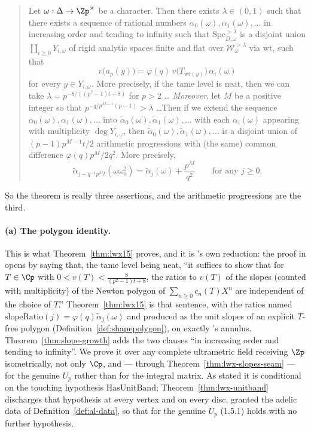 \begin{quote}
  Let $\omega : \Delta \to \Zp^{\times}$ be a character.  Then there exists
  $\lambda \in (0,1)$ such that there exists a sequence of rational numbers
  $\alpha_0(\omega), \alpha_1(\omega), \dots$ in increasing order and tending to infinity such
  that $\mathrm{Spc}^{>\lambda}_{D,\omega}$ is a disjoint union
  $\coprod_{i\geq 0} Y_{i,\omega}$ of rigid analytic spaces finite and flat over
  $\mathcal{W}^{>\lambda}_\omega$ via $\mathrm{wt}$, such that
  \[
    v\bigl(a_p(y)\bigr) = \varphi(q)\,v\bigl(T_{\mathrm{wt}(y)}\bigr)\,\alpha_i(\omega)
    \tag{1.5.1}
  \]
  for every $y \in Y_{i,\omega}$.  More precisely, if the tame level is neat, then we can take
  $\lambda = p^{-8/((p^{2}-1)t+8)}$ for $p > 2$ \dots
  \emph{Moreover}, let $M$ be a positive integer so that $p^{-q/p^{M-1}(p-1)} > \lambda$
  \dots  Then if we extend the sequence $\alpha_0(\omega), \alpha_1(\omega),\dots$ into
  $\tilde\alpha_0(\omega), \tilde\alpha_1(\omega), \dots$ with each $\alpha_i(\omega)$ appearing
  with multiplicity $\deg Y_{i,\omega}$, then
  $\tilde\alpha_0(\omega), \tilde\alpha_1(\omega), \dots$ is a disjoint union of
  $(p-1)p^{M-1}t/2$ arithmetic progressions with (the same) common difference
  $\varphi(q)p^{M}/2q^{2}$.  More precisely,
  \[
    \tilde\alpha_{j + q^{-1}p^{M}t}(\omega\omega_0^{2})
      = \tilde\alpha_j(\omega) + \frac{p^{M}}{q^{2}}
    \qquad\text{for any } j \geq 0.
    \tag{1.5.2}
  \]
\end{quote}

So the theorem is really three assertions, and the arithmetic progressions are the third.

\paragraph{(a) The polygon identity.}  This is what Theorem~\ref{thm:lwx15} proves, and it is
\cite{LWX}'s own reduction: the proof in \cite[\S4.2]{LWX} opens by saying that, the tame level
being neat, ``it suffices to show that for $T \in \Cp$ with
$0 < v(T) < \tfrac{8}{(p^{2}-1)t+8}$, the ratios to $v(T)$ of the slopes (counted with
multiplicity) of the Newton polygon of $\sum_{n\geq0} c_n(T)X^{n}$ are independent of the choice
of $T$.''  Theorem~\ref{thm:lwx15} is that sentence, with the ratios named
$\mathrm{slopeRatio}(j) = \varphi(q)\tilde\alpha_j(\omega)$ and produced as the unit slopes of an
explicit $T$-free polygon (Definition~\ref{def:shapepolygon}), on exactly \cite{LWX}'s annulus.
Theorem~\ref{thm:slope-growth} adds the two clauses ``in increasing order and tending to
infinity''.  We prove it over any complete ultrametric field receiving $\Zp$ isometrically, not
only $\Cp$, and --- through Theorem~\ref{thm:lwx-slopes-seam} --- for the genuine $U_p$ rather
than for the integral matrix.  As stated it is conditional on the touching hypothesis
$\mathrm{HasUnitBand}$; Theorem~\ref{thm:lwx-unitband} discharges that hypothesis at every vertex
and on every disc, granted the adelic data of Definition~\ref{def:al-data}, so that for the genuine
$U_p$ (1.5.1) holds with no further hypothesis.

